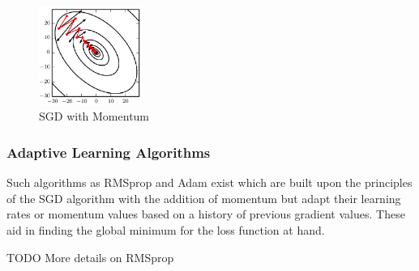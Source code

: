 \begin{figure}[h]
    \centering
        \includegraphics[width=0.3\textwidth]{figures/dl/momentum.png}
    \caption{SGD with Momentum \cite{Goodfellow-et-al-2016}}\label{fig:Momentum}
\end{figure}

\subsubsection{Adaptive Learning Algorithms}
Such algorithms as RMSprop and Adam exist which are built upon the principles of the SGD algorithm with the addition of momentum but adapt their learning rates or momentum values based on a history of previous gradient values.
These aid in finding the global minimum for the loss function at hand.

TODO More details on RMSprop